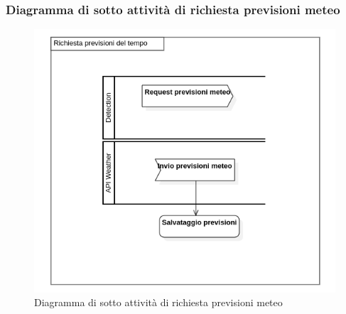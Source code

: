 \subsubsection{Diagramma di sotto attività di richiesta previsioni meteo}\label{DiagrammaSottoAttivitaRichiestaPrevisioniMeteo}
\begin{center}
	\begin{figure}[H]
		\centering\includegraphics[scale=0.8]
    {../immagini/diag_PB/previsioni_del_tempo.png}
		\caption{Diagramma di sotto attività di richiesta previsioni meteo}
	\end{figure}
\end{center}

